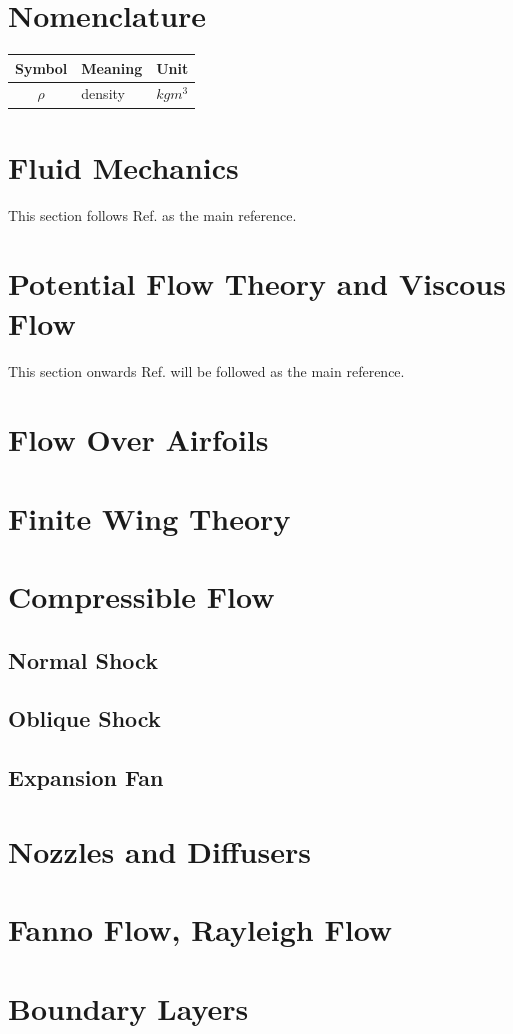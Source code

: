 \section{Nomenclature}
\begin{center}
  \begin{tabular}{c l c}
    \toprule
    Symbol & Meaning & Unit \\
    \midrule
    $\rho$ & density & $kg m^3$ \\
    \bottomrule
  \end{tabular}
\end{center}

\section{Fluid Mechanics}
This section follows Ref. \cite{cengel_fluid_2020} as the main reference.

\section{Potential Flow Theory and Viscous Flow}
This section onwards Ref. \cite{anderson_fundamentals_2024} will be followed as the main reference.

\section{Flow Over Airfoils}

\section{Finite Wing Theory}

\section{Compressible Flow}

\subsection{Normal Shock}

\subsection{Oblique Shock}

\subsection{Expansion Fan}

\section{Nozzles and Diffusers}

\section{Fanno Flow, Rayleigh Flow}

\section{Boundary Layers}